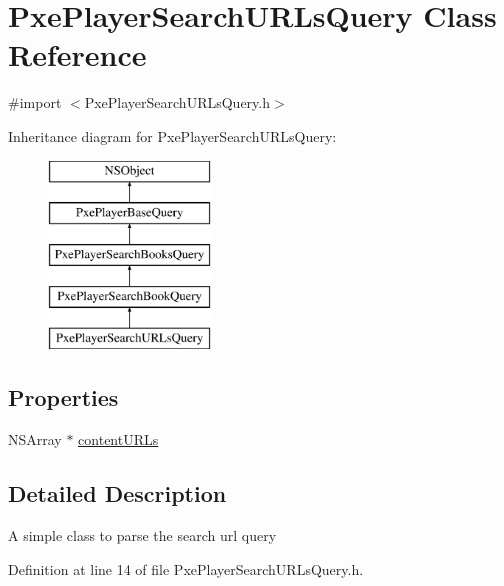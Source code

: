 \hypertarget{interface_pxe_player_search_u_r_ls_query}{\section{Pxe\-Player\-Search\-U\-R\-Ls\-Query Class Reference}
\label{interface_pxe_player_search_u_r_ls_query}
}


{\ttfamily \#import $<$Pxe\-Player\-Search\-U\-R\-Ls\-Query.\-h$>$}

Inheritance diagram for Pxe\-Player\-Search\-U\-R\-Ls\-Query\-:\begin{figure}[H]
\begin{center}
\leavevmode
\includegraphics[height=5.000000cm]{interface_pxe_player_search_u_r_ls_query}
\end{center}
\end{figure}
\subsection*{Properties}
\begin{DoxyCompactItemize}
\item 
N\-S\-Array $\ast$ \hyperlink{interface_pxe_player_search_u_r_ls_query_abb8b87c426ef25427e4ccff33a591e06}{content\-U\-R\-Ls}
\end{DoxyCompactItemize}


\subsection{Detailed Description}
A simple class to parse the search url query 

Definition at line 14 of file Pxe\-Player\-Search\-U\-R\-Ls\-Query.\-h.



